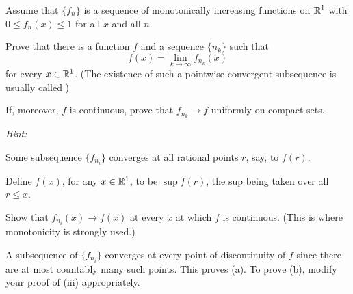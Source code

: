 \begin{myexercise}
    \label{ex:7.13}
    Assume that $\{f_n\}$ is a sequence of monotonically increasing functions on ${\protect\mathbb R}^1$ with $0 \leq f_n(x) \leq 1$ for all $x$ and all $n$.
    \begin{asparaenum}[(a)]
        \item Prove that there is a function $f$ and a sequence $\{n_k\}$ such that 
        \begin{equation*}
            f(x) = \lim_{k \to \infty} f_{n_k}(x)
        \end{equation*}
        for every $x \in {\protect\mathbb R}^1$.
        (The existence of such a pointwise convergent subsequence is usually called )
        \item If, moreover, $f$ is continuous, prove that $f_{n_k} \rightarrow f$ uniformly on compact sets.
    \end{asparaenum}

    \emph{Hint:} \begin{inparaenum}[(i)]
        \item Some subsequence $\{f_{n_i}\}$ converges at all rational points $r$, say, to $f(r)$. 
        \item Define $f(x)$, for any $x \in {\protect\mathbb R}^1$, to be $\sup f(r)$, the sup being taken over all $r \leq x$.
        \item Show that $f_{n_i}(x) \rightarrow f(x)$ at every $x$ at which $f$ is continuous. (This is where monotonicity is strongly used.) 
        \item A subsequence of $\{f_{n_i}\}$ converges at every point of discontinuity of $f$ since there are at most countably many such points. This proves (a). To prove (b), modify your proof of (iii) appropriately.
    \end{inparaenum}
\end{myexercise}


